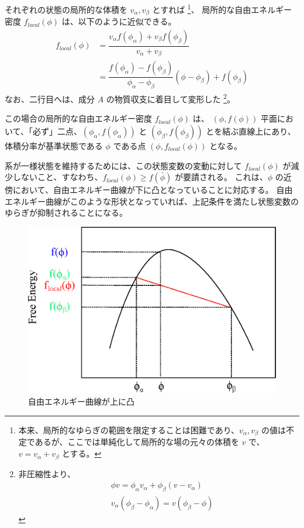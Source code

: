 \documentclass[uplatex,dvipdfmx,a4paper,11pt]{jsarticle}
\begin{document}
\begin{enumerate}
それぞれの状態の局所的な体積を $v_{\alpha}, v_{\beta}$ とすれば
\footnote
{
本来、局所的なゆらぎの範囲を限定することは困難であり、$v_{\alpha}, v_{\beta}$ の値は不定であるが、ここでは単純化して局所的な場の元々の体積を $v$ で、$v= v_{\alpha} + v_{\beta}$ とする。
}、
局所的な自由エネルギー密度 $f_{local}(\phi)$ は、以下のように近似できる。
\begin{align*}
f_{local}(\phi)
	&= \dfrac{v_{\alpha} f(\phi_{\alpha}) + v_{\beta} f(\phi_{\beta})}{v_{\alpha} + v_{\beta}} \\
	&= \dfrac{f (\phi_\alpha) -f (\phi_\beta)}{\phi _\alpha -\phi _\beta} (\phi - \phi _\beta) + f (\phi_\beta)
\end{align*}
なお、二行目へは、成分 $A$ の物質収支に着目して変形した
\footnote
{
非圧縮性より、
\begin{align*}
	& \phi v = \phi_\alpha v_\alpha + \phi_\beta (v - v_\alpha) \\
	& v_\alpha (\phi_\beta - \phi_\alpha) = v(\phi_\beta - \phi) 
\end{align*}
}。


この場合の局所的な自由エネルギー密度 $f_{local} (\phi)$ は、 $(\phi, f(\phi) )$ 平面において、「必ず」二点、$(\phi_\alpha, f (\phi_\alpha) )$ と $(\phi_\beta, f (\phi_\beta) )$ とを結ぶ直線上にあり、体積分率が基準状態である $\phi$ である点 $(\phi, f_{local}(\phi) )$ となる。

系が一様状態を維持するためには、この状態変数の変動に対して $f_{local} (\phi)$ が減少しないこと、すなわち、$f_{local} (\phi) \geq f(\bar{\phi})$ が要請される。
これは、$\phi$ の近傍において、自由エネルギー曲線が下に凸となっていることに対応する。
自由エネルギー曲線がこのような形状となっていれば、上記条件を満たし状態変数のゆらぎが抑制されることになる。

\begin{figure}[htbp]
	\centering
		\includegraphics[width = 8 cm]{./figures/fig3.eps}
	\caption{自由エネルギー曲線が上に凸}
\end{figure}


\end{enumerate}
\end{document}
